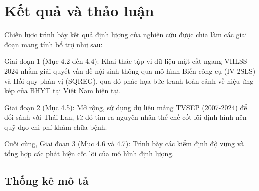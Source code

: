\documentclass[12pt,a4paper]{article}
\begin{document}
\clearpage
\section{Kết quả và thảo luận}

Chiến lược trình bày kết quả định lượng của nghiên cứu được chia làm các giai đoạn mang tính bổ trợ như sau:

Giai đoạn 1 (Mục 4.2 đến 4.4): Khai thác tập vi dữ liệu mặt cắt ngang VHLSS 2024 nhằm giải quyết vấn đề nội sinh thông qua mô hình Biến công cụ (IV-2SLS) và Hồi quy phân vị (SQREG), qua đó phác họa bức tranh toàn cảnh về hiệu ứng kép của BHYT tại Việt Nam hiện tại. 

Giai đoạn 2 (Mục 4.5): Mở rộng, sử dụng dữ liệu mảng TVSEP (2007-2024) để đối sánh với Thái Lan, từ đó tìm ra nguyên nhân thể chế cốt lõi định hình nên quỹ đạo chi phí khám chữa bệnh. 

Cuối cùng, Giai đoạn 3 (Mục 4.6 và 4.7): Trình bày các kiểm định độ vững và tổng hợp các phát hiện cốt lõi của mô hình định lượng.

\subsection{Thống kê mô tả }
\end{document}
